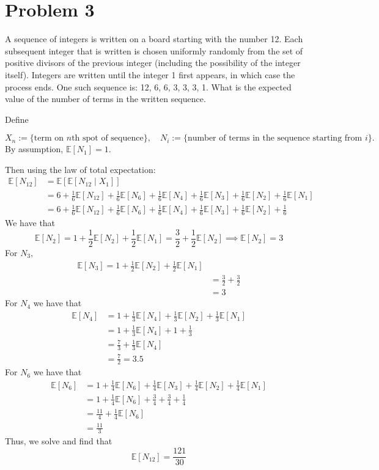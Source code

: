 \documentclass[11pt]{article}
\newcommand{\bbE}{\mathbb{E}}
\begin{document}
\section*{Problem 3}
\begin{problem}
A sequence of integers is written on a board starting with the number 12. Each subsequent integer that is written is chosen uniformly randomly from the set of positive divisors of the previous integer (including the possibility of the integer itself). Integers are written until the integer 1 first appears, in which case the process ends. One such sequence is: 12, 6, 6, 3, 3, 3, 1. What is the expected value of the number of terms in the written sequence.
\end{problem}
\begin{solution}
    Define 
    
    \[X_n := \{\text{term on $n$th spot of sequence}\}, \quad
    N_i := \{\text{number of terms in the sequence starting from $i$}\}.\] By assumption, $\bbE[N_1] = 1.$
    
    Then using the law of total expectation: 
\begin{align*}
    \bbE[N_{12}] &= \bbE[\bbE[N_{12} \mid X_1]]\\
    &= 6 + \frac{1}{6}\bbE[N_{12}] + \frac{1}{6}\bbE[N_6] + \frac{1}{6}\bbE[N_4] + \frac{1}{6}\bbE[N_3] + \frac{1}{6}\bbE[N_2] + \frac{1}{6}\bbE[N_1]\\
    &= 6 + \frac{1}{6}\bbE[N_{12}] + \frac{1}{6}\bbE[N_6] + \frac{1}{6}\bbE[N_4] + \frac{1}{6}\bbE[N_3] + \frac{1}{6}\bbE[N_2] + \frac{1}{6}
\end{align*}
We have that 
\[\bbE[N_2] = 1 + \frac{1}{2}\bbE[N_2] + \frac{1}{2}\bbE[N_1] = \frac{3}{2} + \frac{1}{2}\bbE[N_2] \implies \bbE[N_2] = 3\]
For $N_3,$
\begin{align*}
    \bbE[N_3] = 1 + \frac{1}{2}\bbE[N_2] + \frac{1}{2}\bbE[N_1]\\
    &= \frac{3}{2} + \frac{3}{2}\\
    &= 3
\end{align*}
For $N_4$ we have that
\begin{align*}
    \bbE[N_4] &= 1 + \frac{1}{3}\bbE[N_4] + \frac{1}{3}\bbE[N_2] + \frac{1}{3}\bbE[N_1]\\
    &= 1 + \frac{1}{3}\bbE[N_4] + 1 + \frac{1}{3}\\
    &= \frac{7}{3} + \frac{1}{3}\bbE[N_4]\\
    &= \frac{7}{2} = 3.5
\end{align*}
For $N_6$ we have that 
\begin{align*}
    \bbE[N_6] &= 1 + \frac{1}{4}\bbE[N_6] + \frac{1}{4}\bbE[N_3]+ \frac{1}{4}\bbE[N_2] + \frac{1}{4}\bbE[N_1]\\
    &= 1 + \frac{1}{4}\bbE[N_6] + \frac{3}{4} + \frac{3}{4} + \frac{1}{4}\\
    &= \frac{11}{4} + \frac{1}{4}\bbE[N_6]\\
    &= \frac{11}{3}
\end{align*}
Thus, we solve and find that
\[\boxed{\bbE[N_{12}]= \frac{121}{30}}\]

\end{solution}
\end{document}
